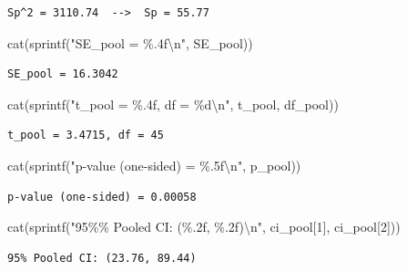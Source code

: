\documentclass[
  letterpaper,
  DIV=11,
  numbers=noendperiod]{scrartcl}
\newenvironment{Shaded}{\begin{snugshade}}{\end{snugshade}}
\newcommand{\DecValTok}[1]{\textcolor[rgb]{0.68,0.00,0.00}{#1}}
\newcommand{\FunctionTok}[1]{\textcolor[rgb]{0.28,0.35,0.67}{#1}}
\newcommand{\NormalTok}[1]{\textcolor[rgb]{0.00,0.23,0.31}{#1}}
\newcommand{\SpecialCharTok}[1]{\textcolor[rgb]{0.37,0.37,0.37}{#1}}
\newcommand{\StringTok}[1]{\textcolor[rgb]{0.13,0.47,0.30}{#1}}
\begin{document}
\begin{verbatim}
Sp^2 = 3110.74  -->  Sp = 55.77
\end{verbatim}

\begin{Shaded}
\begin{Highlighting}[]
\FunctionTok{cat}\NormalTok{(}\FunctionTok{sprintf}\NormalTok{(}\StringTok{"SE\_pool = \%.4f}\SpecialCharTok{\textbackslash{}n}\StringTok{"}\NormalTok{, SE\_pool))}
\end{Highlighting}
\end{Shaded}

\begin{verbatim}
SE_pool = 16.3042
\end{verbatim}

\begin{Shaded}
\begin{Highlighting}[]
\FunctionTok{cat}\NormalTok{(}\FunctionTok{sprintf}\NormalTok{(}\StringTok{"t\_pool = \%.4f, df = \%d}\SpecialCharTok{\textbackslash{}n}\StringTok{"}\NormalTok{, t\_pool, df\_pool))}
\end{Highlighting}
\end{Shaded}

\begin{verbatim}
t_pool = 3.4715, df = 45
\end{verbatim}

\begin{Shaded}
\begin{Highlighting}[]
\FunctionTok{cat}\NormalTok{(}\FunctionTok{sprintf}\NormalTok{(}\StringTok{"p{-}value (one{-}sided) = \%.5f}\SpecialCharTok{\textbackslash{}n}\StringTok{"}\NormalTok{, p\_pool))}
\end{Highlighting}
\end{Shaded}

\begin{verbatim}
p-value (one-sided) = 0.00058
\end{verbatim}

\begin{Shaded}
\begin{Highlighting}[]
\FunctionTok{cat}\NormalTok{(}\FunctionTok{sprintf}\NormalTok{(}\StringTok{"95\%\% Pooled CI: (\%.2f, \%.2f)}\SpecialCharTok{\textbackslash{}n}\StringTok{"}\NormalTok{, ci\_pool[}\DecValTok{1}\NormalTok{], ci\_pool[}\DecValTok{2}\NormalTok{]))}
\end{Highlighting}
\end{Shaded}

\begin{verbatim}
95% Pooled CI: (23.76, 89.44)
\end{verbatim}
\end{document}
